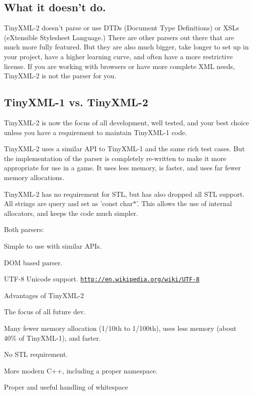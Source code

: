 \subsection*{What it doesn't do. }

Tiny\+X\+M\+L-\/2 doesn't parse or use D\+T\+Ds (Document Type Definitions) or X\+S\+Ls (e\+Xtensible Stylesheet Language.) There are other parsers out there that are much more fully featured. But they are also much bigger, take longer to set up in your project, have a higher learning curve, and often have a more restrictive license. If you are working with browsers or have more complete X\+M\+L needs, Tiny\+X\+M\+L-\/2 is not the parser for you.

\subsection*{Tiny\+X\+M\+L-\/1 vs. Tiny\+X\+M\+L-\/2 }

Tiny\+X\+M\+L-\/2 is now the focus of all development, well tested, and your best choice unless you have a requirement to maintain Tiny\+X\+M\+L-\/1 code.

Tiny\+X\+M\+L-\/2 uses a similar A\+P\+I to Tiny\+X\+M\+L-\/1 and the same rich test cases. But the implementation of the parser is completely re-\/written to make it more appropriate for use in a game. It uses less memory, is faster, and uses far fewer memory allocations.

Tiny\+X\+M\+L-\/2 has no requirement for S\+T\+L, but has also dropped all S\+T\+L support. All strings are query and set as 'const char$\ast$'. This allows the use of internal allocators, and keeps the code much simpler.

Both parsers\+:


\begin{DoxyEnumerate}
\item Simple to use with similar A\+P\+Is.
\item D\+O\+M based parser.
\item U\+T\+F-\/8 Unicode support. \href{http://en.wikipedia.org/wiki/UTF-8}{\tt http\+://en.\+wikipedia.\+org/wiki/\+U\+T\+F-\/8}
\end{DoxyEnumerate}

Advantages of Tiny\+X\+M\+L-\/2


\begin{DoxyEnumerate}
\item The focus of all future dev.
\item Many fewer memory allocation (1/10th to 1/100th), uses less memory (about 40\% of Tiny\+X\+M\+L-\/1), and faster.
\item No S\+T\+L requirement.
\item More modern C++, including a proper namespace.
\item Proper and useful handling of whitespace
\end{DoxyEnumerate}

